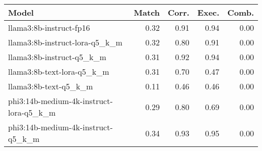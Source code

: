 \begin{tabular}{lrrrr}
\toprule
Model & Match & Corr. & Exec. & Comb. \\
\midrule
llama3:8b-instruct-fp16 & 0.32 & 0.91 & 0.94 & 0.00 \\
llama3:8b-instruct-lora-q5\_k\_m & 0.32 & 0.80 & 0.91 & 0.00 \\
llama3:8b-instruct-q5\_k\_m & 0.31 & 0.92 & 0.94 & 0.00 \\
llama3:8b-text-lora-q5\_k\_m & 0.31 & 0.70 & 0.47 & 0.00 \\
llama3:8b-text-q5\_k\_m & 0.11 & 0.46 & 0.46 & 0.00 \\
phi3:14b-medium-4k-instruct-lora-q5\_k\_m & 0.29 & 0.80 & 0.69 & 0.00 \\
phi3:14b-medium-4k-instruct-q5\_k\_m & 0.34 & 0.93 & 0.95 & 0.00 \\
\bottomrule
\end{tabular}
